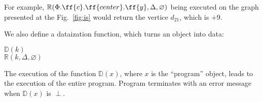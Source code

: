 For example, $\mathbb{R}(\Phi.\ff{c}.\ff{center}.\ff{y},
\Delta, \varnothing)$ being executed on the graph presented at the
Fig.~\ref{fig:is} would return the vertice $d_{21}$, which is $+9$.

We also define a dataization function, which turns an object into data:

\begin{algo}
 $\mathbb{D}(k)$ \\
  \tab {} $\mathbb{R}(k, \Delta, \varnothing)$ \\
\end{algo}

The execution of the function $\mathbb{D}(x)$, where $x$ is the
``program'' object, leads to the execution of the entire program.
Program terminates with an error message when $\mathbb{D}(x)$ is $\perp$.

